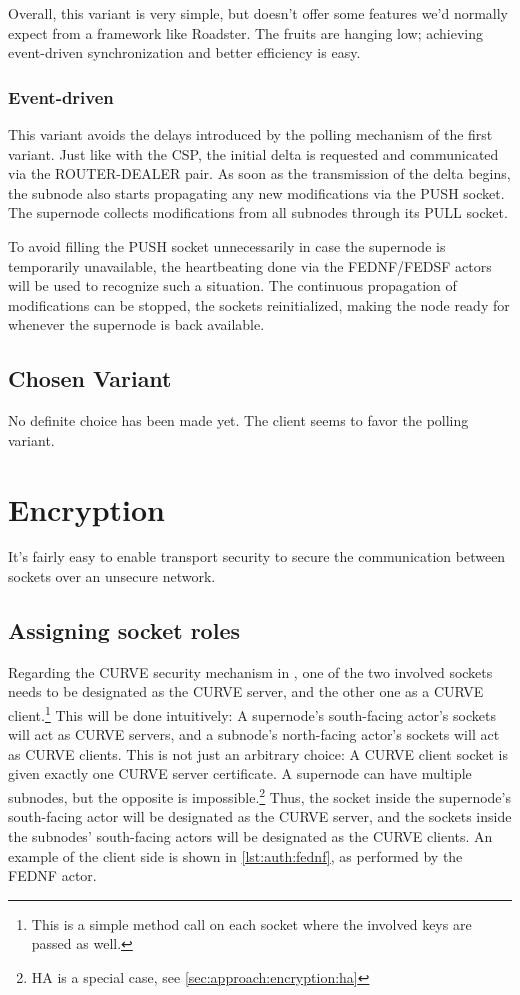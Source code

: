 Overall, this variant is very simple, but doesn't offer some features we'd
normally expect from a framework like Roadster. The fruits are hanging low;
achieving event-driven synchronization and better efficiency is easy.

\subsubsection{Event-driven}
This variant avoids the delays introduced by the polling mechanism of the first
variant. Just like with the \gls{CSP}, the initial delta is requested and
communicated via the ROUTER-DEALER pair. As soon as the transmission of the
delta begins, the subnode also starts propagating any new modifications via the
PUSH socket. The supernode collects modifications from all subnodes through its
PULL socket.

To avoid filling the PUSH socket unnecessarily in case the supernode is
temporarily unavailable, the heartbeating done via the FEDNF/FEDSF actors will
be used to recognize such a situation. The continuous propagation of
modifications can be stopped, the sockets reinitialized, making the node ready
for whenever the supernode is back available.

\subsection{Chosen Variant}
No definite choice has been made yet. The client seems to favor the polling variant.

\section{Encryption}\label{sec:approach:encryption}
It's fairly easy to enable transport security to secure the communication
between \zmq sockets over an unsecure network.

\subsection{Assigning socket roles}
Regarding the CURVE security mechanism in \zmq, one of the two involved sockets
needs to be designated as the CURVE server, and the other one as a CURVE
client.\footnote{This is a simple method call on each socket where the involved
keys are passed as well.} This will be done intuitively: A supernode's
south-facing actor's sockets will act as CURVE servers, and a subnode's
north-facing actor's sockets will act as CURVE clients. This is not just an
arbitrary choice: A CURVE client socket is given exactly one CURVE server
certificate. A supernode can have multiple subnodes, but the opposite is
impossible.\footnote{HA is a special case, see
\autoref{sec:approach:encryption:ha}} Thus, the socket inside the supernode's
south-facing actor will be designated as the CURVE server, and the sockets
inside the subnodes' south-facing actors will be designated as the CURVE
clients. An example of the client side is shown in \autoref{lst:auth:fednf}, as
performed by the FEDNF actor.

